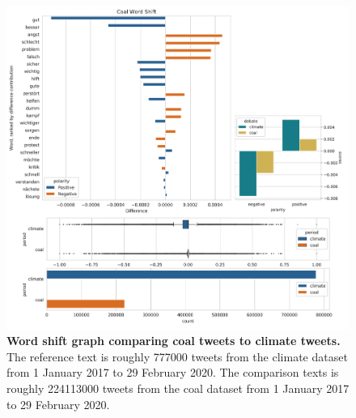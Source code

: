\documentclass[12pt,onecolumn,twoside]{layout}
\begin{document}
\begin{figure} 
	\begin{center}
		\includegraphics[width=\linewidth]{figures/wordshift_coal_climate_composite}
	\end{center}
	\caption{\textbf{Word shift graph comparing coal tweets to climate tweets.} The reference text is roughly 777000 tweets from the climate dataset from 1 January 2017 to 29 February 2020. The comparison texts is roughly 224113000 tweets from the coal dataset from 1 January 2017 to 29 February 2020.}
	\label{fig:wordshift_coal_climate}
\end{figure}
\end{document}
